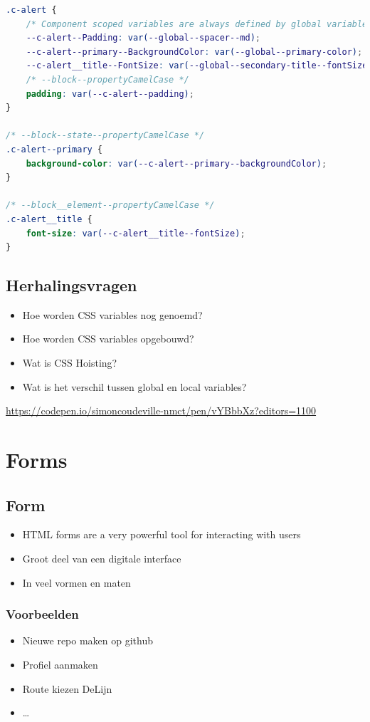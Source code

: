 \documentclass{article}
\begin{document}
\begin{lstlisting}[language=CSS]
.c-alert {
    /* Component scoped variables are always defined by global variables */
    --c-alert--Padding: var(--global--spacer--md);
    --c-alert--primary--BackgroundColor: var(--global--primary-color);
    --c-alert__title--FontSize: var(--global--secondary-title--fontSize);
    /* --block--propertyCamelCase */
    padding: var(--c-alert--padding);
}

/* --block--state--propertyCamelCase */
.c-alert--primary {
    background-color: var(--c-alert--primary--backgroundColor);
}

/* --block__element--propertyCamelCase */
.c-alert__title {
    font-size: var(--c-alert__title--fontSize);
}
\end{lstlisting}

\subsection{Herhalingsvragen}

\begin{itemize}
    \item Hoe worden CSS variables nog genoemd?
    \item Hoe worden CSS variables opgebouwd?
    \item Wat is CSS Hoisting?
    \item Wat is het verschil tussen global en local variables?
\end{itemize}

\url{https://codepen.io/simoncoudeville-nmct/pen/vYBbbXz?editors=1100}

\section{Forms}

\subsection{Form}
\begin{itemize}
    \item HTML forms are a very powerful tool for interacting with users
    \item Groot deel van een digitale interface
    \item In veel vormen en maten
\end{itemize}

\subsubsection{Voorbeelden}
\begin{itemize}
    \item Nieuwe repo maken op github
    \item Profiel aanmaken
    \item Route kiezen DeLijn
    \item \dots
\end{itemize}
\end{document}
